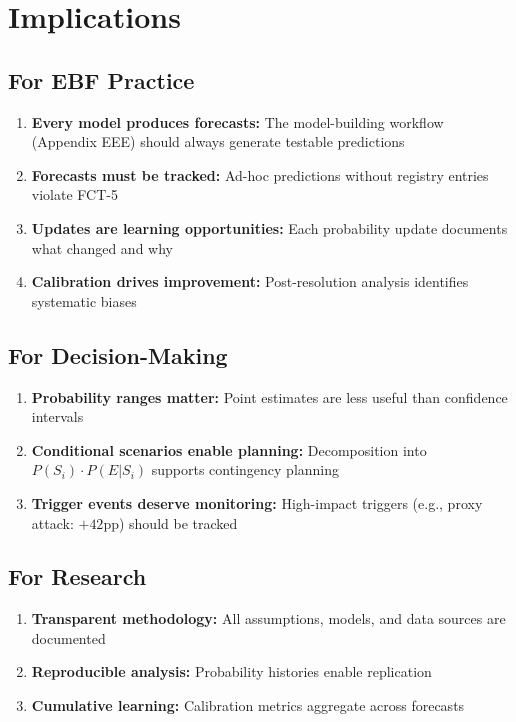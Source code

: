 \section{Implications}
\label{sec:fct-implications}

\subsection{For EBF Practice}

\begin{enumerate}
    \item \textbf{Every model produces forecasts:} The model-building workflow (Appendix EEE) should always generate testable predictions
    \item \textbf{Forecasts must be tracked:} Ad-hoc predictions without registry entries violate FCT-5
    \item \textbf{Updates are learning opportunities:} Each probability update documents what changed and why
    \item \textbf{Calibration drives improvement:} Post-resolution analysis identifies systematic biases
\end{enumerate}

\subsection{For Decision-Making}

\begin{enumerate}
    \item \textbf{Probability ranges matter:} Point estimates are less useful than confidence intervals
    \item \textbf{Conditional scenarios enable planning:} Decomposition into $P(S_i) \cdot P(E|S_i)$ supports contingency planning
    \item \textbf{Trigger events deserve monitoring:} High-impact triggers (e.g., proxy attack: $+42$pp) should be tracked
\end{enumerate}

\subsection{For Research}

\begin{enumerate}
    \item \textbf{Transparent methodology:} All assumptions, models, and data sources are documented
    \item \textbf{Reproducible analysis:} Probability histories enable replication
    \item \textbf{Cumulative learning:} Calibration metrics aggregate across forecasts
\end{enumerate}


